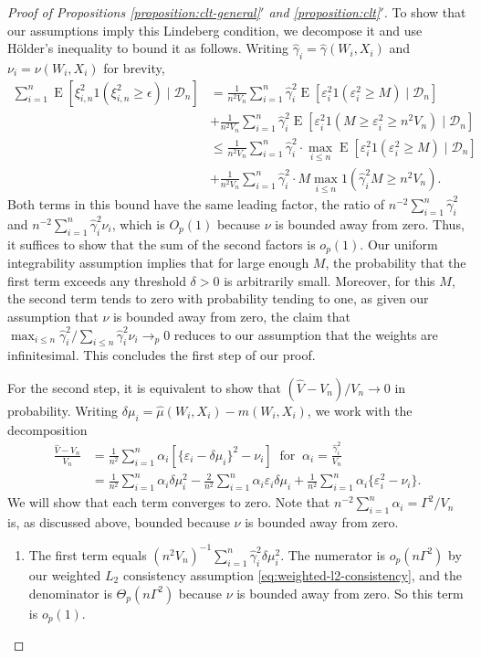 \documentclass{article}
\theoremstyle{definition}
\DeclareMathOperator{\E}{E}
\newcommand{\dm}{\delta \mu}
\newcommand{\hgamma}{\ensuremath{\hat\gamma}}
\newcommand{\<}{\langle}
\renewcommand{\>}{\rangle}
\begin{document}
\begin{refsection}
\begin{proof}[Proof of Propositions \ref{proposition:clt-general}$'$ and \ref{proposition:clt}$'$]
To show that our assumptions imply this Lindeberg condition, we decompose it and use H\"older's inequality to bound it as follows. Writing $\hgamma_i = \hgamma(W_i, X_i)$ and $\nu_i = \nu(W_i, X_i)$ for brevity,
\begin{align*}
    \sum_{i=1}^n \E[\xi_{i,n}^2 1(\xi_{i,n}^2 \ge \epsilon) \mid \mathcal{D}_n] &=  \frac{1}{n^2 V_n}\sum_{i=1}^n \hgamma_i^2 \E[\varepsilon_i^2 1(\varepsilon_i^2 \ge M) \mid \mathcal{D}_n] \\& +
    \frac{1}{n^2 V_n}\sum_{i=1}^n \hgamma_i^2 \E[\varepsilon_i^2 1(M \ge \varepsilon_i^2 \ge n^2 V_n) \mid \mathcal{D}_n] \\
&\le \frac{1}{n^2 V_n}\sum_{i=1}^n \hgamma_i^2 \cdot  \max_{i \le n}\E[\varepsilon_i^2 1(\varepsilon_i^2 \ge M) \mid \mathcal{D}_n]\\
&+ \frac{1}{n^2 V_n}\sum_{i=1}^n \hgamma_i^2 \cdot  M\max_{i \le n}1(\hgamma_i^2 M \ge n^2 V_n).
\end{align*}
Both terms in this bound have the same leading factor, the ratio of $n^{-2}\sum_{i=1}^n \hgamma_i^2$ and $n^{-2}\sum_{i=1}^n \hgamma_i^2 \nu_i$, which is $O_p(1)$ because $\nu$ is bounded away from zero. Thus, it suffices to show that the sum of the second factors is $o_p(1)$. Our uniform integrability assumption implies that for large enough $M$, the probability that the first term exceeds any threshold $\delta>0$ is arbitrarily small.
Moreover, for this $M$, the second term tends to zero with probability tending to one, as given our assumption that $\nu$ is bounded away from zero, the claim that
$\max_{i \le n}\hgamma_i^2 / \sum_{i \le n}\hgamma_i^2 \nu_i \to_p 0$
reduces to our assumption that the weights are infinitesimal. This concludes the first step of our proof.

For the second step, it is equivalent to show that $(\hat V - V_n)/V_n \to 0$ in probability. Writing $\dm_i = \hat \mu(W_i, X_i) - m(W_i, X_i)$, we work with the decomposition
\begin{align*}
\frac{\hat V - V_n}{V_n}
&= \frac{1}{n^2}\sum_{i=1}^n \alpha_i [ \{\varepsilon_i - \dm_i\}^2 - \nu_i] \ \text{ for } \ \alpha_i = \frac{\hgamma_i^2}{V_n} \\
&= \frac{1}{n^2} \sum_{i=1}^n \alpha_i \dm_i^2 - \frac{2}{n^2} \sum_{i=1}^{n} \alpha_i \varepsilon_i \dm_i +
\frac{1}{n^2} \sum_{i=1}^n \alpha_i \{\varepsilon_i^2 - \nu_i\}.
\end{align*}
We will show that each term converges to zero. Note that $n^{-2}\sum_{i=1}^n \alpha_i = \Gamma^2/V_n$ is, as discussed above, bounded because $\nu$ is bounded away from zero.
\begin{enumerate}
\item
The first term equals $(n^2 V_n)^{-1} \sum_{i=1}^n \hgamma_i^2 \dm_i^2$. The numerator is $o_p(n\Gamma^2)$ by our weighted $L_2$ consistency assumption \eqref{eq:weighted-l2-consistency}, and the denominator is $\Theta_p(n\Gamma^2)$ because $\nu$ is bounded away from zero. So this term is $o_p(1)$.


\end{enumerate}
\end{proof}
\end{refsection}
\end{document}
